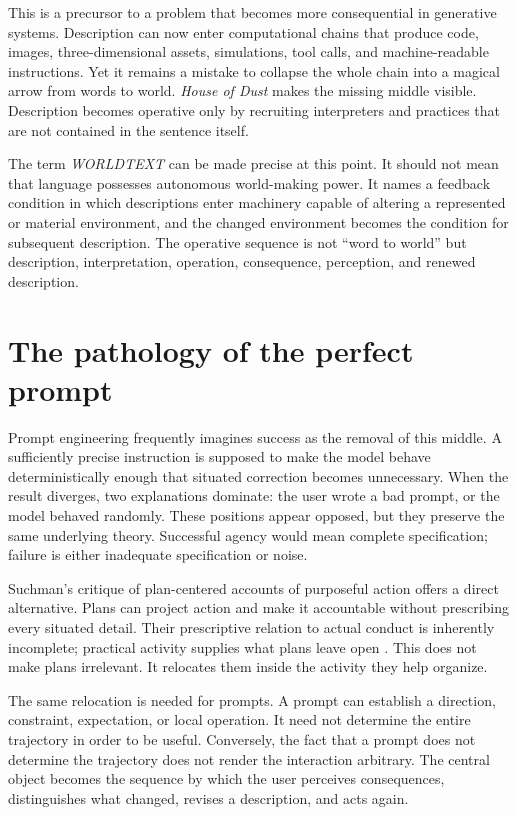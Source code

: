 \documentclass[11pt]{article}
\begin{document}
This is a precursor to a problem that becomes more consequential in generative systems. Description can now enter computational chains that produce code, images, three-dimensional assets, simulations, tool calls, and machine-readable instructions. Yet it remains a mistake to collapse the whole chain into a magical arrow from words to world. \emph{House of Dust} makes the missing middle visible. Description becomes operative only by recruiting interpreters and practices that are not contained in the sentence itself.

The term \emph{WORLDTEXT} can be made precise at this point. It should not mean that language possesses autonomous world-making power. It names a feedback condition in which descriptions enter machinery capable of altering a represented or material environment, and the changed environment becomes the condition for subsequent description. The operative sequence is not ``word to world'' but description, interpretation, operation, consequence, perception, and renewed description.

\section{The pathology of the perfect prompt}
Prompt engineering frequently imagines success as the removal of this middle. A sufficiently precise instruction is supposed to make the model behave deterministically enough that situated correction becomes unnecessary. When the result diverges, two explanations dominate: the user wrote a bad prompt, or the model behaved randomly. These positions appear opposed, but they preserve the same underlying theory. Successful agency would mean complete specification; failure is either inadequate specification or noise.

Suchman's critique of plan-centered accounts of purposeful action offers a direct alternative. Plans can project action and make it accountable without prescribing every situated detail. Their prescriptive relation to actual conduct is inherently incomplete; practical activity supplies what plans leave open \citep{suchman2007}. This does not make plans irrelevant. It relocates them inside the activity they help organize.

The same relocation is needed for prompts. A prompt can establish a direction, constraint, expectation, or local operation. It need not determine the entire trajectory in order to be useful. Conversely, the fact that a prompt does not determine the trajectory does not render the interaction arbitrary. The central object becomes the sequence by which the user perceives consequences, distinguishes what changed, revises a description, and acts again.
\end{document}
